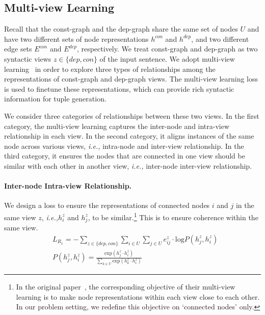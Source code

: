 \documentclass[11pt]{article}
\newcommand{\ie}{\emph{i.e.,}\xspace}
\begin{document}
\subsection{Multi-view Learning}


Recall that the const-graph and the dep-graph share the same set of nodes $U$ and have two different sets of node representations $h^{con}$ and $h^{dep}$, and two different edge sets $E^{con}$ and $E^{dep}$, respectively. We treat const-graph and dep-graph as two syntactic views $z \in \{dep,con\}$ of the input sentence.
We adopt multi-view learning~\cite{mane_multi_view_2021} in order to explore three types of relationships among the representations of const-graph and dep-graph views. The multi-view learning loss is used to finetune these representations, which can provide rich syntactic information for tuple generation.

We consider three categories of relationships between these two views. In the first category, the multi-view learning captures the inter-node and intra-view relationship in each view. In the second category, it aligns instances of the same node across various views, \ie intra-node and inter-view relationship. In the third category, it ensures the nodes that are connected in one view should be similar with each other in another view, \ie inter-node inter-view relationship.


\paragraph{Inter-node Intra-view Relationship.}
We design a loss to ensure the representations of connected nodes $i$ and $j$ in the same view $z$, \ie $h_i^z$ and $h_j^z$, to be similar.\footnote{In the original paper~\cite{mane_multi_view_2021}, the corresponding objective of their multi-view learning is to make node representations within each view close to each other. In our problem setting, we redefine this objective on `connected nodes' only.} This is to ensure coherence within the same view.
\begin{align}
    &L_{R_1} = - \sum_{z \in \{dep, con\}} \sum_{i \in U} \sum_{j \in U} e_{ij}^z \cdot \mathrm{log} P(h_j^z ,h_i^z) \label{eq:loss_div} \\
    &P(h_j^z ,h_i^z) =  \frac{\mathrm{exp}(h_j^z \cdot h_i^z)}{\sum_{k \in U} \mathrm{exp} (h_k^z \cdot h_i^z)} \label{eq:softmax}
\end{align}
\end{document}
